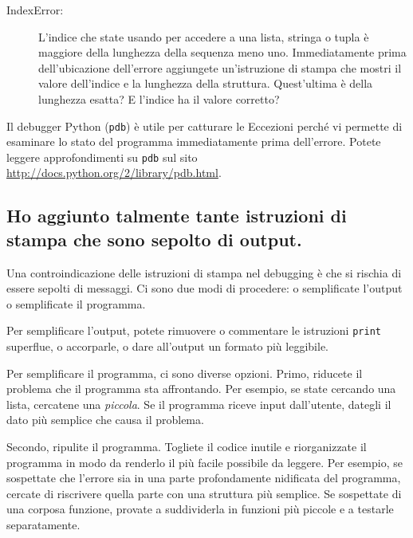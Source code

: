 \documentclass[10pt]{book}
\begin{document}
\begin{description}
\item[IndexError:] L'indice che state usando per accedere a una lista, stringa o tupla è maggiore della lunghezza della sequenza meno uno. Immediatamente prima dell'ubicazione dell'errore aggiungete un'istruzione di stampa che mostri il valore dell'indice e la lunghezza della struttura. Quest'ultima è della lunghezza esatta? E l'indice ha il valore corretto?

\end{description}

Il debugger Python ({\tt pdb}) è utile per catturare le Eccezioni perché vi permette di esaminare lo stato del programma immediatamente prima dell'errore. Potete leggere approfondimenti su {\tt pdb} sul sito \url{http://docs.python.org/2/library/pdb.html}.


\subsection{Ho aggiunto talmente tante istruzioni di stampa che sono sepolto di output.}

Una controindicazione delle istruzioni di stampa nel debugging è che si rischia di essere sepolti di messaggi. Ci sono due modi di procedere: o semplificate l'output o semplificate il programma.

Per semplificare l'output, potete rimuovere o commentare le istruzioni {\tt print} superflue, o accorparle, o dare all'output un formato più leggibile.

Per semplificare il programma, ci sono diverse opzioni. Primo, riducete il problema che il programma sta affrontando. Per esempio, se state cercando una lista, cercatene una {\em piccola}.  Se il programma riceve input dall'utente, dategli il dato più semplice che causa il problema.

Secondo, ripulite il programma. Togliete il codice inutile e riorganizzate il programma in modo da renderlo il più facile possibile da leggere. Per esempio, se sospettate che l'errore sia in una parte profondamente nidificata del programma, cercate di riscrivere quella parte con una struttura più semplice. Se sospettate di una corposa funzione, provate a suddividerla in funzioni più piccole e a testarle separatamente.
\end{document}
